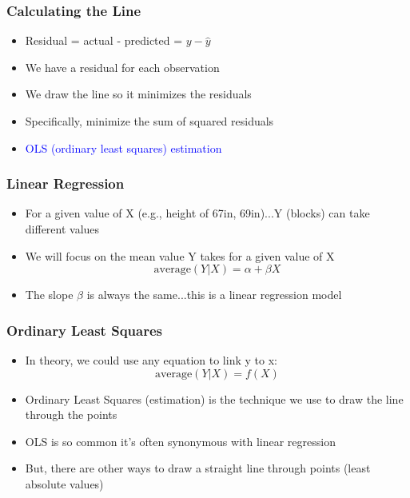 \documentclass[handout]{beamer}
\newcommand{\blue}{\textcolor{blue}}
\begin{document}
\begin{frame}
 \frametitle<+->{Calculating the Line}
 \begin{minipage}{.28\linewidth}
 \end{minipage}\hfill
 \begin{minipage}{.7\linewidth}
 \begin{itemize}[<+->]
   \item Residual = actual - predicted = $y -\hat{y}$
   \item We have a residual for each observation
   \item We draw the line so it minimizes the residuals
   \item Specifically, minimize the sum of squared residuals
   \item \blue{OLS (ordinary least squares) estimation}
 \end{itemize}
 \end{minipage}
\end{frame}

\begin{frame}
 \frametitle<+->{Linear Regression}
 \begin{itemize}[<+->]
   \item For a given value of X (e.g., height of 67in, 69in)...Y (blocks) can take different values
   \item We will focus on the \alert{mean} value Y takes for a given value of X
   $$\mbox{average}(Y|X) = \alpha + \beta X$$
   \item The slope $\beta$ is always the same...this is a \alert{linear} regression model
 \end{itemize}
\end{frame}

\begin{frame}
 \frametitle<+->{Ordinary Least Squares}
 \begin{minipage}{.58\linewidth}
 \begin{itemize}[<+->]
   \item In theory, we could use any equation to link y to x: $$\mbox{average}(Y|X) = f(X)$$
   \item Ordinary Least Squares (estimation) is the technique we use to draw the line 
through the points
   \item OLS is so common it's often synonymous with linear regression
   \item But, there are other ways to draw a straight line through points (least absolute values)
 \end{itemize}
 \end{minipage}\hfill
 \begin{minipage}{.38\linewidth}
 \end{minipage}
\end{frame}
\end{document}
